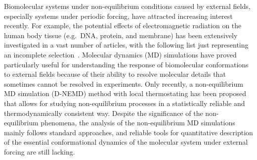 \documentclass[journal=jctcce,manuscript=article]{achemso}
\begin{document}
Biomolecular systems under non-equilibrium conditions caused by external fields, especially
systems under periodic forcing, have attracted increasing
interest recently.  For example, the potential effects of electromagnetic
radiation on the human body tissue (e.g.~DNA, protein, and membrane)  has been extensively
investigated in a vast number of articles, with the following list just representing an incomplete selection~\cite{bohr2000microwave, bohr2000microwave-1, dePomerai2000cell,
  dePomerai2003microwave, mancinelli2004non, inskip2001cellular, bekard2013electric, budi2005electric,
  budi2007effect, budi2008comparative, astrakas2012structural,
  damm2012can, english2009nonequilibrium, solomentsev2012effects}.  Molecular dynamics (MD) simulations have proved particularly useful for understanding
the response of biomolecular conformations to external fields because of their ability to  resolve molecular
details that sometimes cannot be resolved in experiments. Only
recently, a non-equilibrium MD simulation (D-NEMD) method with local thermostating has been proposed~\cite{wang2014exploring} that allows for studying 
non-equilibrium processes in a statistically reliable and thermodynamically consistent way. 
Despite the significance of the non-equilibrium phenomena, the
analysis of the non-equilibrium MD simulations mainly follows standard approaches, and reliable tools for quantitative description of
the essential conformational dynamics of the molecular system under external forcing are still lacking. 

\end{document}
